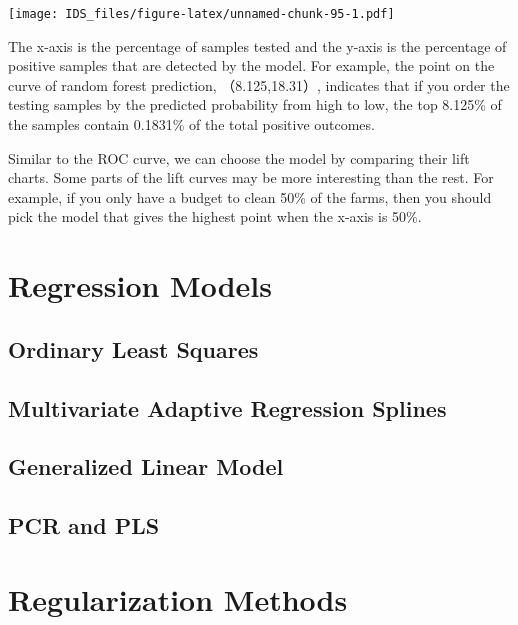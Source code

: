 \documentclass[12pt,]{krantz}
\begin{document}
\texttt{[image: IDS\_files/figure-latex/unnamed-chunk-95-1.pdf]}

The x-axis is the percentage of samples tested and the y-axis is the percentage of positive samples that are detected by the model. For example, the point on the curve of random forest prediction, （8.125,18.31）, indicates that if you order the testing samples by the predicted probability from high to low, the top 8.125\% of the samples contain 0.1831\% of the total positive outcomes.

Similar to the ROC curve, we can choose the model by comparing their lift charts. Some parts of the lift curves may be more interesting than the rest. For example, if you only have a budget to clean 50\% of the farms, then you should pick the model that gives the highest point when the x-axis is 50\%.

\hypertarget{regression-models}{%
\chapter{Regression Models}\label{regression-models}}

\hypertarget{ordinary-least-squares}{%
\section{Ordinary Least Squares}\label{ordinary-least-squares}}

\hypertarget{multivariate-adaptive-regression-splines}{%
\section{Multivariate Adaptive Regression Splines}\label{multivariate-adaptive-regression-splines}}

\hypertarget{generalized-linear-model}{%
\section{Generalized Linear Model}\label{generalized-linear-model}}

\hypertarget{pcr-and-pls}{%
\section{PCR and PLS}\label{pcr-and-pls}}

\hypertarget{regularization-methods}{%
\chapter{Regularization Methods}\label{regularization-methods}}
\end{document}
